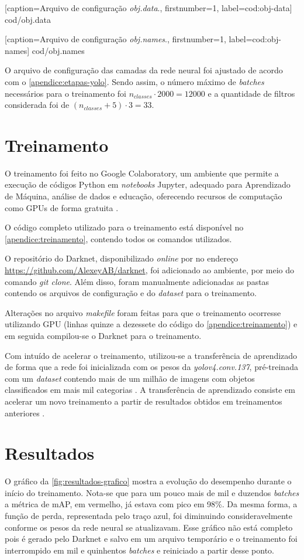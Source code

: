 
[caption=Arquivo de configuração \textit{obj.data}.,
firstnumber=1,
label=cod:obj-data]
{cod/obj.data}


[caption=Arquivo de configuração \textit{obj.names}.,
firstnumber=1,
label=cod:obj-names]
{cod/obj.names}

O arquivo de configuração das camadas da rede neural foi ajustado de acordo com o \autoref{apendice:etapas-yolo}. Sendo assim, o número máximo de \textit{batches} necessários para o treinamento foi $n_{classes} \cdot 2000 = 12000$ e a quantidade de filtros considerada foi de $(n_{classes} + 5) \cdot 3 = 33$.

\section{Treinamento} \label{cap:treinamento-treinamento}
O treinamento foi feito no Google Colaboratory, um ambiente que permite a execução de códigos Python em \textit{notebooks} Jupyter, adequado para Aprendizado de Máquina, análise de dados e educação, oferecendo recursos de computação como GPUs de forma gratuita \cite{ref:Colab}.

O código completo utilizado para o treinamento está disponível no \autoref{apendice:treinamento}, contendo todos os comandos utilizados.

O repositório do Darknet, disponibilizado \textit{online} por  no endereço \url{https://github.com/AlexeyAB/darknet}, foi adicionado ao ambiente, por meio do comando \textit{git clone}. Além disso, foram manualmente adicionadas as pastas contendo os arquivos de configuração e do \textit{dataset} para o treinamento.

Alterações no arquivo \textit{makefile} foram feitas para que o treinamento ocorresse utilizando GPU (linhas quinze a dezessete do código do \autoref{apendice:treinamento}) e em seguida compilou-se o Darknet para o treinamento.

Com intuído de acelerar o treinamento, utilizou-se a transferência de aprendizado de forma que a rede foi inicializada com os pesos da \textit{yolov4.conv.137}, pré-treinada com um \textit{dataset} contendo mais de um milhão de imagens com objetos classificados em mais mil categorias \cite{ref:Redmon-et-al}. A transferência de aprendizado consiste em acelerar um novo treinamento a partir de resultados obtidos em treinamentos anteriores \cite{ref:Cai-Bileschi-Nielsen}.

\section{Resultados} \label{cap:treinamento-resultados}
O gráfico da \autoref{fig:resultados-grafico} mostra a evolução do desempenho durante o início do treinamento. Nota-se que para um pouco mais de mil e duzendos \textit{batches} a métrica de mAP, em vermelho, já estava com pico em 98\%. Da mesma forma, a função de perda, representada pelo traço azul, foi diminuindo consideravelmente conforme os pesos da rede neural se atualizavam. Esse gráfico não está completo pois é gerado pelo Darknet e salvo em um arquivo temporário e o treinamento foi interrompido em mil e quinhentos \textit{batches} e reiniciado a partir desse ponto.

